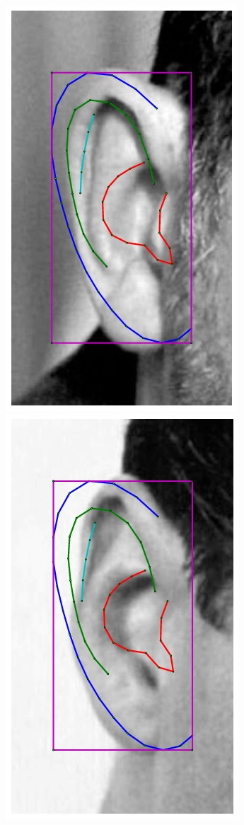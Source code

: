 \begin{figure}
    \\
    \includegraphics[height=\flowh]{resources/Ear_Deformable_Model/fittings/initial_0005}
    \hfill
    \includegraphics[height=\flowh]{resources/Ear_Deformable_Model/fittings/initial_0006}

\end{figure}
